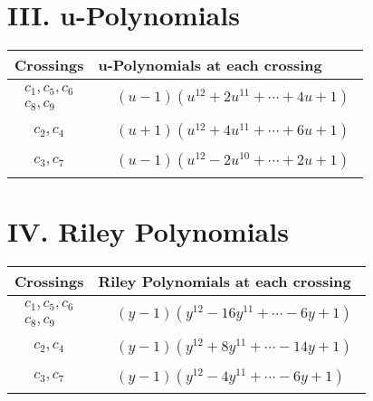 \documentclass[1p]{elsarticle_modified}
\theoremstyle{definition}
\begin{document}
\newpage\renewcommand{\arraystretch}{1}
\centering \section*{ III. u-Polynomials}
\begin{tabular}{m{50pt}|m{274pt}}
Crossings & \hspace{64pt}u-Polynomials at each crossing \\
\hline $$\begin{aligned}c_{1},c_{5},c_{6}\\c_{8},c_{9}\end{aligned}$$&$\begin{aligned}
&(u-1)(u^{12}+2 u^{11}+\cdots+4 u+1)
\end{aligned}$\\
\hline $$\begin{aligned}c_{2},c_{4}\end{aligned}$$&$\begin{aligned}
&(u+1)(u^{12}+4 u^{11}+\cdots+6 u+1)
\end{aligned}$\\
\hline $$\begin{aligned}c_{3},c_{7}\end{aligned}$$&$\begin{aligned}
&(u-1)(u^{12}-2 u^{10}+\cdots+2 u+1)
\end{aligned}$\\
\hline
\end{tabular}\newpage\renewcommand{\arraystretch}{1}
\centering \section*{ IV. Riley Polynomials}
\begin{tabular}{m{50pt}|m{274pt}}
Crossings & \hspace{64pt}Riley Polynomials at each crossing \\
\hline $$\begin{aligned}c_{1},c_{5},c_{6}\\c_{8},c_{9}\end{aligned}$$&$\begin{aligned}
&(y-1)(y^{12}-16 y^{11}+\cdots-6 y+1)
\end{aligned}$\\
\hline $$\begin{aligned}c_{2},c_{4}\end{aligned}$$&$\begin{aligned}
&(y-1)(y^{12}+8 y^{11}+\cdots-14 y+1)
\end{aligned}$\\
\hline $$\begin{aligned}c_{3},c_{7}\end{aligned}$$&$\begin{aligned}
&(y-1)(y^{12}-4 y^{11}+\cdots-6 y+1)
\end{aligned}$\\
\hline
\end{tabular}
\vskip 2pc
\end{document}
